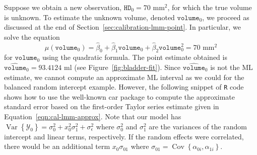 \documentclass[cmfont,usenames,dvipsnames,leqno]{afit-etd}\usepackage[]{graphicx}\usepackage[]{color}
\newcommand{\code}[1]{\texttt{\small{#1}}}
\newcommand{\pkg}[1]{\textsf{\small{#1}}}
\newcommand{\mc}[1]{\ensuremath{\mathcal{#1}}}
\newcommand{\wh}[1]{\ensuremath{\widehat{#1}}}
\newcommand{\var}{\operatorname{Var}}
\newcommand{\cov}{\operatorname{Cov}}
\begin{document}
Suppose we obtain a new observation, $\texttt{HD}_0 = 70 \text{ mm}^2$, for which the true volume is unknown. To estimate the unknown volume, denoted $\texttt{volume}_0$, we proceed as discussed at the end of Section~\ref{sec:calibration-lmm-point}. In particular, we solve the equation 
\begin{equation*}
\wh{\mu}\left(\texttt{volume}_0\right) = \wh{\beta}_0 + \wh{\beta}_1\texttt{volume}_0 + \wh{\beta}_2\texttt{volume}_0^2 = 70 \text{ mm}^2
\end{equation*}
for $\texttt{volume}_0$ using the quadratic formula. The point estimate obtained is $\wh{\texttt{volume}}_0 = 93.4124$ ml (see Figure~\ref{fig:bladder-fit}). Since $\wh{\texttt{volume}}_0$ is not the ML estimate, we cannot compute an approximate ML interval as we could for the balanced random intercept example. However, the following snippet of \code{R} code shows how to use the well-known \pkg{car} package \citep{fox_r_2011} to compute the approximate standard error based on the first-order Taylor series estimate given in Equation~\eqref{eqn:cal-lmm-approx}. Note that our model has $\var\left\{\mc{Y}_0\right\} = \sigma_0^2 + x_0^2\sigma_1^2 + \sigma_\epsilon^2$ where $\sigma_0^2$ and $\sigma_1^2$ are the variances of the random intercept and linear terms, respectively. If the random effects were correlated, there would be an additional term $x_0\sigma_{01}$ where $\sigma_{01} = \cov\left\{\alpha_{0i}, \alpha_{1i}\right\}$. 
\end{document}
